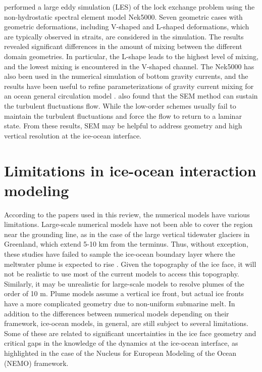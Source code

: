 \documentclass[11pt,a4paper]{article}
\begin{document}
	\cite{ilicak2009non} performed a large eddy simulation (LES) of the lock exchange problem using the non-hydrostatic spectral element model Nek5000. %
	Seven geometric cases with geometric deformations, including V-shaped and L-shaped deformations, which are typically observed in straits, are considered in the simulation. The results revealed significant differences in the amount of mixing between the different domain geometries. In particular, the L-shape leads to the highest level of mixing, and the lowest mixing is encountered in the V-shaped channel. The Nek5000 has also been used in the numerical simulation of bottom gravity currents, and the results have been useful to refine parameterizations of gravity current mixing for an ocean general circulation model \citep{chang2005comparison, ilicak2009non}. \cite{karniadakis1989spectral} also found that the SEM method can sustain the turbulent fluctuations flow. While the low-order schemes usually fail to maintain the turbulent fluctuations and force the flow to return to a laminar state. %
	From these results, SEM may be helpful to address geometry and high vertical resolution at the ice-ocean interface.

	
	
	\section{Limitations in ice-ocean interaction modeling}
	
    According to the papers used in this review, the numerical models have various limitations. Large-scale numerical models have not been able to cover the region near the grounding line, as in the case of the large vertical tidewater glaciers in Greenland, which extend 5-10 km from the terminus. Thus, without exception, these studies have failed to sample the ice-ocean boundary layer where the meltwater plume is expected to rise \citep{straneo2012characteristics}. Given the topography of the ice face, it will not be realistic to use most of the current models to access this topography. Similarly, it may be unrealistic for large-scale models to resolve plumes of the order of 10 m. Plume models assume a vertical ice front, but actual ice fronts have a more complicated geometry due to non-uniform submarine melt.
    In addition to the differences between numerical models depending on their framework, ice-ocean models, in general, are still subject to several limitations. Some of these are related to significant uncertainties in the ice face geometry and critical gaps in the knowledge of the dynamics at the ice-ocean interface, as \cite{mathiot2017explicit} highlighted in the case of the Nucleus for European Modeling of the Ocean (NEMO) framework.
    
\end{document}
